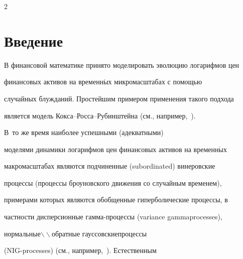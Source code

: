 





      \thispagestyle{headings}



      \begin{multicols}{2}



            \label{st\stat}







\section{Введение}



В финансовой математике принято моделировать эволюцию логарифмов цен

финансовых активов на временн$\acute{\mbox{ы}}$х микромасштабах с помощью

случай\-ных блужданий. Простейшим примером применения такого подхода

является модель Кок\-са--Рос\-са--Ру\-бин\-штей\-на (см., например,~\cite{Shiryaev1998}).

В~то же время наиболее успешными (адекватными)

моделями динамики логарифмов цен финансовых активов на временн$\acute{\mbox{ы}}$х

макромасштабах являются подчиненные (subordinated) винеровские

процессы (процессы броуновского движения со случайным временем),

примерами которых являются обобщенные гиперболические процессы, в

частности дисперсионные гам\-ма-про\-цес\-сы (variance gamma\linebreak processes),

нормальные$\backslash\!\backslash$обратные гауссовские\linebreak процессы

(NIG-processes) (см., например,~\cite{Korolev2011}). Естественным


\end{multicols}
